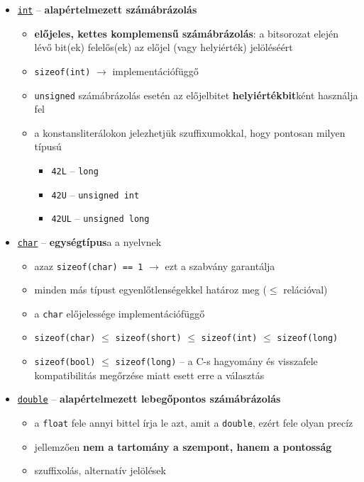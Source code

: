 \documentclass[a4paper, 11pt, oneside]{book}
\begin{document}
\begin{itemize}
\begin{itemize}
	\end{itemize}
	\item \underline{\texttt{int}} -- \textbf{alapértelmezett számábrázolás}
	\begin{itemize}
		\item \textbf{előjeles, kettes komplemensű számábrázolás}: a bitsorozat elején lévő bit(ek) felelős(ek) az előjel (vagy helyiérték) jelöléséért
		\item \verb|sizeof(int)| $\to$ implementációfüggő
		\item \verb*|unsigned| számábrázolás esetén az előjelbitet \textbf{helyiértékbit}ként használja fel
		\item a konstansliterálokon jelezhetjük szuffixumokkal, hogy pontosan milyen típusú
		\begin{itemize}
			\item \verb*|42L| -- \verb|long|
			\item \verb*|42U| -- \verb|unsigned int|
			\item \verb*|42UL| -- \verb|unsigned long|
		\end{itemize}
	\end{itemize}
	\item \underline{\texttt{char}} -- \textbf{egységtípus}a a nyelvnek
	\begin{itemize}
		\item azaz \verb|sizeof(char) == 1| $\to$ ezt a szabvány garantálja
		\item minden más típust egyenlőtlenségekkel határoz meg ($\leq$ relációval)
		\item a \verb*|char| előjelessége implementációfüggő
		\item \verb*|sizeof(char)| $\leq$ \verb*|sizeof(short)| $\leq$ \verb*|sizeof(int)| $\leq$ \verb*|sizeof(long)|
		\item \verb*|sizeof(bool)| $\leq$ \verb*|sizeof(long)| -- a C-s hagyomány és visszafele kompatibilitás megőrzése miatt esett erre a választás
	\end{itemize}
	\item \underline{\texttt{double}} -- \textbf{alapértelmezett lebegőpontos számábrázolás}
	\begin{itemize}
		\item a \verb*|float| fele annyi bittel írja le azt, amit a \verb*|double|, ezért fele olyan precíz
		\item jellemzően \textbf{nem a tartomány a szempont, hanem a pontosság}
		\item szuffixolás, alternatív jelölések
		\begin{itemize}

\end{itemize}
\end{itemize}
\end{itemize}
\end{document}

